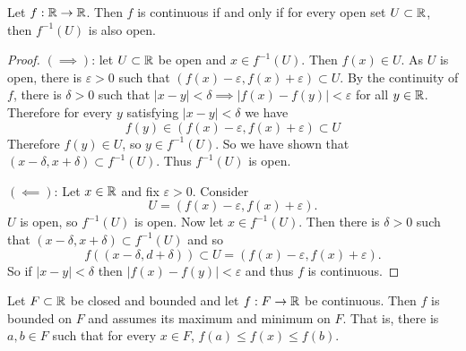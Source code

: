 
\begin{proposition}[]
	Let $f: \mathbb{R} \to \mathbb{R}$.
	Then $f$ is continuous if and only if
	for every open set $U \subset \mathbb{R}$,
	then $f^{-1}(U)$ is also open.
\end{proposition}

\begin{proof}
	$(\implies)$:
	let $U \subset \mathbb{R}$ be open and $x \in f^{-1}(U)$.
	Then $f(x) \in U$.
	As $U$ is open, there is $\varepsilon > 0$
	such that 
	$(f(x) - \varepsilon, f(x) + \varepsilon) \subset U$.
	By the continuity of $f$, there is $\delta > 0$
	such that
	$\left\lvert x - y \right\rvert < \delta \implies
	\left\lvert f(x) - f(y) \right\rvert < \varepsilon$
	for all $y \in \mathbb{R}$.
	Therefore for every $y$ satisfying
	$\left\lvert x - y \right\rvert < \delta$
	we have
	\[
		f(y) 
		\in \left( f(x) - \varepsilon, f(x) + \varepsilon \right)
		\subset U
	\]
	Therefore $f(y) \in U$,
	so $y \in f^{-1}(U)$.
	So we have shown that
	$(x - \delta, x + \delta) \subset f^{-1}(U)$.
	Thus $f^{-1}(U)$ is open.

	$(\impliedby)$:
	Let $x \in \mathbb{R}$ and fix $\varepsilon > 0$.
	Consider
	\[
		U = \left( f(x) - \varepsilon, f(x) + \varepsilon \right).
	\]
	$U$ is open, so $f^{-1}(U)$ is open.
	Now let $x \in f^{-1}(U)$.
	Then there is $\delta > 0$ such that
	$
		(x - \delta, x + \delta) \subset f^{-1}(U)
	$
	and so
	\[
		f\left( (x - \delta, d + \delta) \right)
		\subset U
		= (f(x) - \varepsilon, f(x) + \varepsilon).
	\]
	So if $\left\lvert x - y \right\rvert < \delta$
	then $\left\lvert f(x) - f(y) \right\rvert < \varepsilon$
	and thus $f$ is continuous.
\end{proof}

\begin{theorem}[]
	Let $F \subset \mathbb{R}$ be closed and bounded and let $f: F \to \mathbb{R}$
	be continuous.
	Then $f$ is bounded on $F$ and assumes its maximum and minimum on $F$.
	That is,
	there is $a, b \in F$ such that for every $x \in F$, 
	$f(a) \leq f(x) \leq f(b)$.
\end{theorem}

